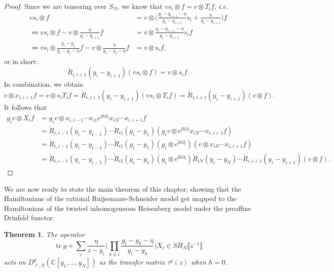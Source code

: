 \documentclass[11pt]{report}
\newtheorem{theorem}{Theorem}[section]
\theoremstyle{definition}
\theoremstyle{remark}
\theoremstyle{remark}
\newcommand{\C}{\mathbb{C}}
\newcommand{\I}{\mathrm{i}}
\begin{document}
\begin{proof}
Since we are tensoring over $S_N$, we know that $v s_i \otimes f = v \otimes T_i f$, \emph{i.e.}
\begin{align*}
vs_i  \otimes f &= v \otimes \bigg( \frac{y_i-y_{i+1}-\eta}{y_i-y_{i+1}} s_i + \frac{\eta}{y_i-y_{i+1}} \bigg) f \\
\Leftrightarrow v s_i \otimes f - v \otimes \frac{\eta}{y_i-y_{i+1}} f &= v \otimes \frac{y_i-y_{i+1}-\eta}{y_i-y_{i+1}} s_i f \\
\Leftrightarrow v s_i \otimes \frac{y_i-y_j}{y_i-y_j-\eta} f - v \otimes \frac{\eta}{y_i-y_j-\eta} f &= v \otimes s_i f,
\end{align*}
or in short:
\begin{equation*}
\check R_{i,i+1}(y_i-y_{i+1}) (v s_i \otimes f) = v \otimes s_i f.
\end{equation*}
In combination, we obtain
\begin{equation*}
v \otimes x_{i,i+1} f = v \otimes s_i T_i f = \check R_{i,i+1}(y_i-y_{i+1}) (v s_i \otimes T_i f) = \check R_{i,i+1}(y_i-y_{i+1})(v \otimes f).
\end{equation*}
It follows that
\begin{align*}
g_i v \otimes X_i f
&= g_i v \otimes x_{i,i-1} \cdots x_{i1} e^{\I \hbar \partial_i} x_{iN} \cdots x_{i,i+1} f \\
&= \check R_{i,i-1}(y_i-y_{i-1}) \cdots \check R_{i1}(y_i-y_1) (g_i v \otimes e^{\I \hbar \partial_i} x_{iN} \cdots x_{i,i+1} f) \\
&= \check R_{i,i-1}(y_i-y_{i-1}) \cdots \check R_{i1}(y_i-y_1) (g_i \otimes e^{\I \hbar \partial_i}) (v \otimes x_{iN} \cdots x_{i,i+1} f) \\
&= \check R_{i,i-1}(y_i-y_{i-1}) \cdots \check R_{i1}(y_i-y_1) (g_i \otimes e^{\I \hbar \partial_i}) \check R_{iN}(y_i-y_N) \cdots \check R_{i,i+1}(y_i-y_{i+1}) (v \otimes f).
\end{align*}
\end{proof}

We are now ready to state the main theorem of this chapter, showing that the Hamiltonians of the rational Ruijsenaars-Schneider model get mapped to the Hamiltonians of the twisted inhomogeneous Heisenberg model under the preaffine Drinfeld functor:

\begin{theorem}
The operator
\begin{equation*}
\operatorname{tr} g + \sum_i \frac{\eta}{z-y_i} \bigg( \prod_{k \neq i} \frac{y_i-y_k-\eta}{y_i-y_k} \bigg) X_i \in S\ddot H_N\llbracket z^{-1} \rrbracket
\end{equation*}
acts on $D_{\ell,N}^g(\C[y_1,...,y_N])$ as the transfer matrix $\tau^g(z)$ when $\hbar = 0$.
\end{theorem}
\end{document}
